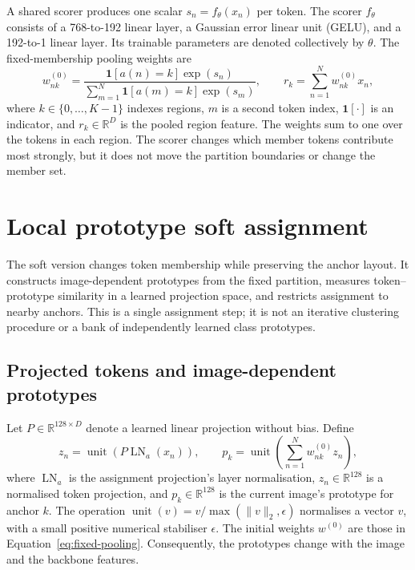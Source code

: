 A shared scorer produces one scalar $s_n=f_{\theta}(x_n)$ per token.
The scorer $f_{\theta}$ consists of a 768-to-192 linear layer, a Gaussian error
linear unit (GELU), and a 192-to-1 linear layer. Its trainable parameters are
denoted collectively by $\theta$. The fixed-membership pooling weights are
\begin{equation}
 w^{(0)}_{nk}=
 \frac{\mathbf{1}[a(n)=k]\exp(s_n)}
 {\sum_{m=1}^{N}\mathbf{1}[a(m)=k]\exp(s_m)},
 \qquad
 r_k=\sum_{n=1}^{N}w^{(0)}_{nk}x_n,
 \label{eq:fixed-pooling}
\end{equation}
where $k\in\{0,\ldots,K-1\}$ indexes regions, $m$ is a second token index,
$\mathbf{1}[\cdot]$ is an indicator, and
$r_k\in\mathbb{R}^{D}$ is the pooled region feature.
The weights sum to one over the tokens in each region. The scorer changes
which member tokens contribute most strongly, but it does not move the
partition boundaries or change the member set.

\section{Local prototype soft assignment}

The soft version changes token membership while preserving the anchor layout.
It constructs image-dependent prototypes from the fixed partition, measures
token--prototype similarity in a learned projection space, and restricts
assignment to nearby anchors. This is a single assignment step; it is not an
iterative clustering procedure or a bank of independently learned class
prototypes.

\subsection{Projected tokens and image-dependent prototypes}

Let $P\in\mathbb{R}^{128\times D}$ denote a learned linear projection without
bias. Define
\begin{equation}
 z_n=\operatorname{unit}\!\left(P\operatorname{LN}_{a}(x_n)\right),
 \qquad
 p_k=\operatorname{unit}\!\left(\sum_{n=1}^{N}w^{(0)}_{nk}z_n\right),
 \label{eq:soft-prototypes}
\end{equation}
where $\operatorname{LN}_{a}$ is the assignment projection's layer
normalisation, $z_n\in\mathbb{R}^{128}$ is a normalised token projection, and
$p_k\in\mathbb{R}^{128}$ is the current image's prototype for anchor $k$.
The operation $\operatorname{unit}(v)=v/\max(\|v\|_2,\epsilon)$ normalises
a vector $v$, with a small positive numerical stabiliser $\epsilon$.
The initial weights $w^{(0)}$ are those in Equation~\eqref{eq:fixed-pooling}.
Consequently, the prototypes change with the image and the backbone features.

